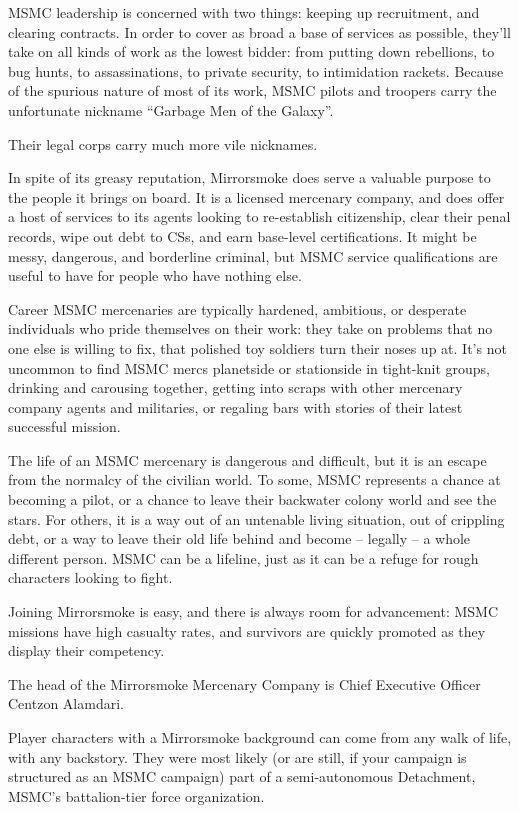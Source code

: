 MSMC leadership is concerned with two things: keeping up recruitment, and clearing contracts.
In order to cover as broad a base of services as possible, they'll take on all kinds of work as the
lowest bidder: from putting down rebellions, to bug hunts, to assassinations, to private security,
to intimidation rackets. Because of the spurious nature of most of its work, MSMC pilots and
troopers carry the unfortunate nickname ``Garbage Men of the Galaxy''.

Their legal corps carry much more vile nicknames.

In spite of its greasy reputation, Mirrorsmoke does serve a valuable purpose to the people it
brings on board. It is a licensed mercenary company, and does offer a host of services to its
agents looking to re-establish citizenship, clear their penal records, wipe out debt to CSs, and
earn base-level certifications. It might be messy, dangerous, and borderline criminal, but MSMC
service qualifications are useful to have for people who have nothing else.

Career MSMC mercenaries are typically hardened, ambitious, or desperate individuals who pride
themselves on their work: they take on problems that no one else is willing to fix, that polished
toy soldiers turn their noses up at. It's not uncommon to find MSMC mercs planetside or
stationside in tight-knit groups, drinking and carousing together, getting into scraps with other
mercenary company agents and militaries, or regaling bars with stories of their latest successful
mission.

The life of an MSMC mercenary is dangerous and difficult, but it is an escape from the normalcy
of the civilian world. To some, MSMC represents a chance at becoming a pilot, or a chance to
leave their backwater colony world and see the stars. For others, it is a way out of an untenable
living situation, out of crippling debt, or a way to leave their old life behind and become -- legally
-- a whole different person. MSMC can be a lifeline, just as it can be a refuge for rough
characters looking to fight.

Joining Mirrorsmoke is easy, and there is always room for advancement: MSMC missions have
high casualty rates, and survivors are quickly promoted as they display their competency.

The head of the Mirrorsmoke Mercenary Company is Chief Executive Officer Centzon Alamdari.

Player characters with a Mirrorsmoke background can come from any walk of life, with any
backstory. They were most likely (or are still, if your campaign is structured as an MSMC
campaign) part of a semi-autonomous Detachment, MSMC's battalion-tier force organization.

